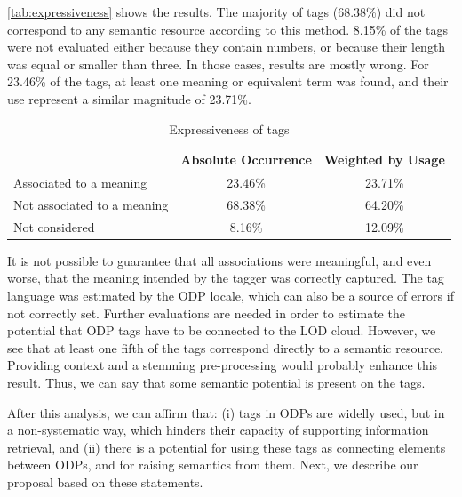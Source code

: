 \documentclass[conference]{IEEEtran}
\begin{document}
\autoref{tab:expressiveness} shows the results. 
The majority of tags (68.38\%) did not correspond to any semantic resource according to this method.
8.15\% of the tags were not evaluated either because they contain numbers, or because their length was equal or smaller than three. 
In those cases, results are mostly wrong.
For 23.46\% of the tags, at least one meaning or equivalent term was found, and their use represent a similar magnitude of 23.71\%.

\begin{table}[]
\centering
\caption{Expressiveness of tags}
\label{tab:expressiveness}
\begin{tabular}{|l|c|c|}
\hline
                            & \textbf{Absolute Occurrence} & \textbf{Weighted by Usage} \\ \hline
Associated to a meaning     & 23.46\%           & 23.71\%                    \\ \hline
Not associated to a meaning & 68.38\%           & 64.20\%                    \\ \hline
Not considered              & 8.16\%            & 12.09\%                    \\ \hline
\end{tabular}
\end{table}

It is not possible to guarantee that all associations were meaningful, and even worse, that the meaning intended by the tagger was correctly captured.
The tag language was estimated by the ODP locale, which can also be a source of errors if not correctly set.
Further evaluations are needed in order to estimate the potential that ODP tags have to be connected to the LOD cloud.
However, we see that at least one fifth of the tags correspond directly to a semantic resource.
Providing context and a stemming pre-processing would probably enhance this result.
Thus, we can say that some semantic potential is present on the tags.

\hspace{0.2pt}

After this analysis, we can affirm that: (i) tags in ODPs are widelly used, but in a non-systematic way, which hinders their capacity of supporting information retrieval, and (ii) there is a potential for using these tags as connecting elements between ODPs, and for raising semantics from them.
Next, we describe our proposal based on these statements.
\end{document}
